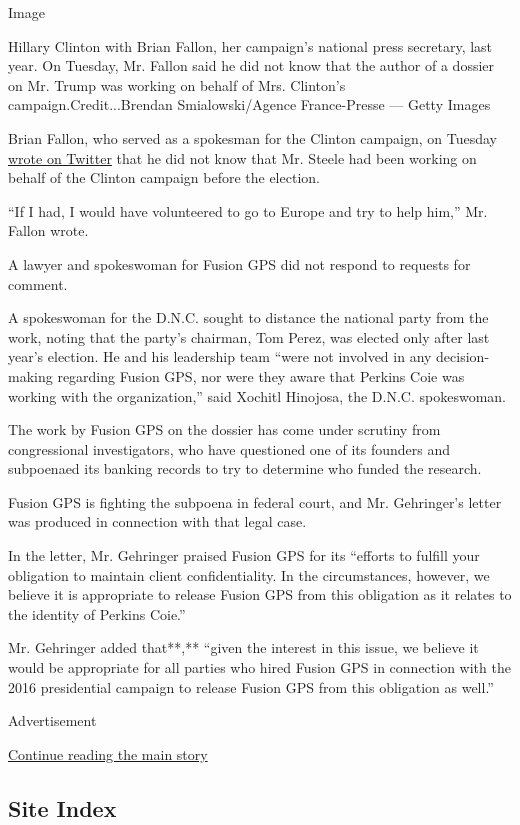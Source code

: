 Image

Hillary Clinton with Brian Fallon, her campaign's national press
secretary, last year. On Tuesday, Mr. Fallon said he did not know that
the author of a dossier on Mr. Trump was working on behalf of Mrs.
Clinton's campaign.Credit...Brendan Smialowski/Agence France-Presse ---
Getty Images

Brian Fallon, who served as a spokesman for the Clinton campaign, on
Tuesday
\href{https://twitter.com/brianefallon/status/922990478387183616}{wrote
on Twitter} that he did not know that Mr. Steele had been working on
behalf of the Clinton campaign before the election.

``If I had, I would have volunteered to go to Europe and try to help
him,'' Mr. Fallon wrote.

A lawyer and spokeswoman for Fusion GPS did not respond to requests for
comment.

A spokeswoman for the D.N.C. sought to distance the national party from
the work, noting that the party's chairman, Tom Perez, was elected only
after last year's election. He and his leadership team ``were not
involved in any decision-making regarding Fusion GPS, nor were they
aware that Perkins Coie was working with the organization,'' said
Xochitl Hinojosa, the D.N.C. spokeswoman.

The work by Fusion GPS on the dossier has come under scrutiny from
congressional investigators, who have questioned one of its founders and
subpoenaed its banking records to try to determine who funded the
research.

Fusion GPS is fighting the subpoena in federal court, and Mr.
Gehringer's letter was produced in connection with that legal case.

In the letter, Mr. Gehringer praised Fusion GPS for its ``efforts to
fulfill your obligation to maintain client confidentiality. In the
circumstances, however, we believe it is appropriate to release Fusion
GPS from this obligation as it relates to the identity of Perkins
Coie.''

Mr. Gehringer added that**,** ``given the interest in this issue, we
believe it would be appropriate for all parties who hired Fusion GPS in
connection with the 2016 presidential campaign to release Fusion GPS
from this obligation as well.''

Advertisement

\protect\hyperlink{after-bottom}{Continue reading the main story}

\hypertarget{site-index}{%
\subsection{Site Index}\label{site-index}}

